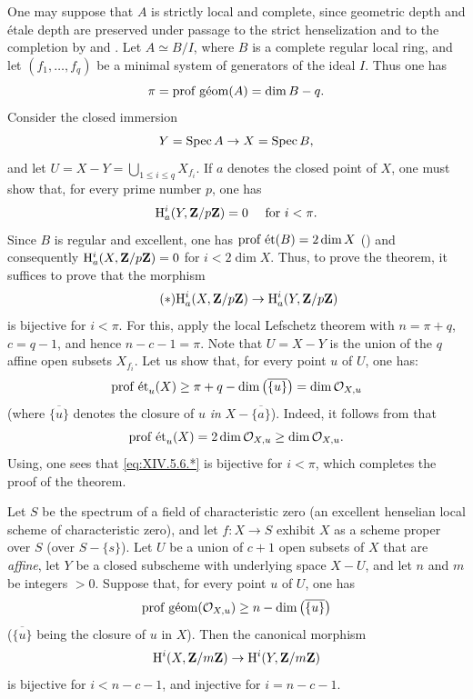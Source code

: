 One may suppose that $A$ is strictly local and complete, since geometric depth and \'{e}tale depth are preserved under passage to the strict henselization and to the completion by  and . Let $A\simeq B/I$, where $B$ is a complete regular local ring, and let $(f_{1},\dots, f_{q})$ be a minimal system of generators of the ideal $I$. Thus one has\pageoriginale
$$
\pi=\operatorname{prof\;g\acute{e}om}(A)=\dim B-q.
$$
Consider the closed immersion
$$Y=\operatorname{Spec} A\to X=\operatorname{Spec} B,
$$
and let\sisi{}{} $U=X-Y=\bigcup_{1\leq i\leq q}X_{f_{i}}$. If $a$ denotes the closed point of $X$, one must show that, for every prime number $p$, one has
$$
\mathrm H_{a}^{i}(Y, \mathbf Z/p\mathbf Z)=0\quad\textrm{ for }i<\pi.
$$
Since $B$ is regular and excellent, one has $\operatorname{prof\;\acute{e}t}(B)=2\dim X$ (\cf {}) and consequently $\mathrm H_{a}^{i}(X, \mathbf Z/p\mathbf Z)=0$ for $i<2\dim X$. Thus, to prove the theorem, it suffices to prove that the morphism
\begin{equation*} \label{eq:XIV.5.6.*} \tag{$*$}
\mathrm H_{a}^{i}(X, \mathbf Z/p\mathbf Z)\to\mathrm H_{a}^{i}(Y, \mathbf Z/p\mathbf Z)
\end{equation*}
is bijective for $i<\pi$. For this, apply the local Lefschetz theorem  with $n=\pi+q$, $c=q-1$, and hence $n-c-1=\pi$. Note that $U=X-Y$ is the union of the $q$ affine open subsets $X_{f_{i}}$. Let us show that, for every point $u$ of $U$, one has:
$$
\operatorname{prof\;\acute{e}t}_{u}(X)\geq\pi+q-\dim\big(\overline{\{ u\} }\big)=\dim\mathcal O_{X, u}$$
(where $\overline{\{ u\} }$ denotes the closure of $u$ \emph{in} $X-\overline{\{ a\} }$). Indeed, it follows from  that
$$
\operatorname{prof\;\acute{e}t}_{u}(X)=2\dim\mathcal O_{X, u}\geq\dim\mathcal O_{X, u}.
$$
Using\pageoriginaled {}, one sees that \eqref{eq:XIV.5.6.*} is bijective for $i<\pi$, which completes the proof of the theorem.

\begin{corollaire} \label{XIV.5.7} Let $S$ be the spectrum of a field of characteristic zero (\resp an excellent henselian local scheme of characteristic zero), and let $f\colon X\to S$ exhibit $X$ as a scheme proper over $S$ (\resp over $S-\{ s\}$). Let $U$ be a union of $c+1$ open subsets of $X$ that are \emph{affine}, let $Y$ be a closed subscheme with underlying space $X-U$, and let $n$ and $m$ be integers $>0$. Suppose that, for every point $u$ of $U$, one has
$$
\operatorname{prof\;g\acute{e}om}(\mathcal O_{X, u})\geq n-\dim\big(\overline{\{ u\} }\big)$$
($\overline{\{ u\} }$ being the closure of $u$ in $X$). Then the canonical morphism
$$
\mathrm H^{i}(X, \mathbf Z/m\mathbf Z)\to\mathrm H^{i}(Y, \mathbf Z/m\mathbf Z)$$
is bijective for $i<n-c-1$, and injective for $i=n-c-1$.
\end{corollaire}

